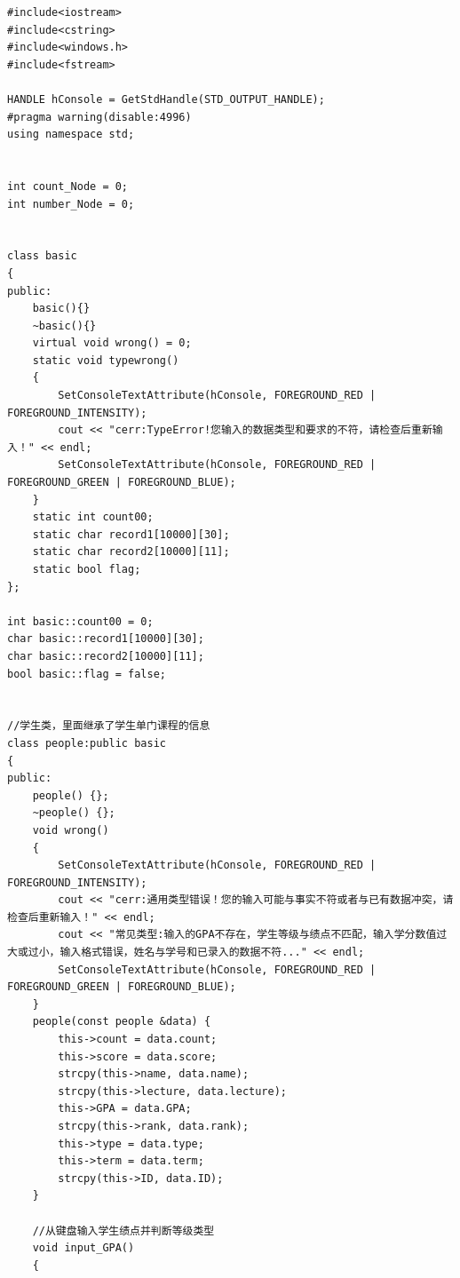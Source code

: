 \documentclass[fontset=windows]{article}
\begin{document}
\appendix
{}    %
\vspace{1cm}
\begin{lstlisting}[style = {cppstyle}]
#include<iostream>
#include<cstring>
#include<windows.h>
#include<fstream>

HANDLE hConsole = GetStdHandle(STD_OUTPUT_HANDLE);
#pragma warning(disable:4996)
using namespace std;


int count_Node = 0;
int number_Node = 0;


class basic
{
public:
	basic(){}
	~basic(){}
	virtual void wrong() = 0;
	static void typewrong()
	{
		SetConsoleTextAttribute(hConsole, FOREGROUND_RED | FOREGROUND_INTENSITY);
		cout << "cerr:TypeError!您输入的数据类型和要求的不符，请检查后重新输入！" << endl;
		SetConsoleTextAttribute(hConsole, FOREGROUND_RED | FOREGROUND_GREEN | FOREGROUND_BLUE);
	}
	static int count00;
	static char record1[10000][30];
	static char record2[10000][11];
	static bool flag;
};

int basic::count00 = 0;
char basic::record1[10000][30];
char basic::record2[10000][11];
bool basic::flag = false;


//学生类，里面继承了学生单门课程的信息
class people:public basic
{
public:
	people() {};
	~people() {};
	void wrong()
	{
		SetConsoleTextAttribute(hConsole, FOREGROUND_RED | FOREGROUND_INTENSITY);
		cout << "cerr:通用类型错误！您的输入可能与事实不符或者与已有数据冲突，请检查后重新输入！" << endl;
		cout << "常见类型:输入的GPA不存在，学生等级与绩点不匹配，输入学分数值过大或过小，输入格式错误，姓名与学号和已录入的数据不符..." << endl;
		SetConsoleTextAttribute(hConsole, FOREGROUND_RED | FOREGROUND_GREEN | FOREGROUND_BLUE);
	}
	people(const people &data) {
		this->count = data.count;
		this->score = data.score;
		strcpy(this->name, data.name);
		strcpy(this->lecture, data.lecture);
		this->GPA = data.GPA;
		strcpy(this->rank, data.rank);
		this->type = data.type;
		this->term = data.term;
		strcpy(this->ID, data.ID);
	}

	//从键盘输入学生绩点并判断等级类型 
	void input_GPA()
	{


\end{lstlisting}
\end{document}
